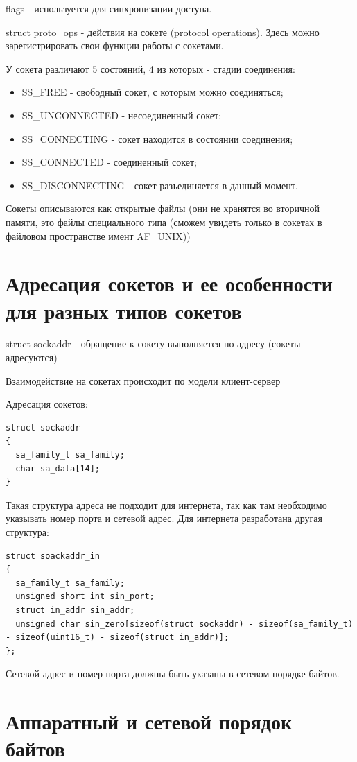 flags - используется для синхронизации доступа.

struct proto\_ops - действия на сокете (protocol operations). Здесь можно зарегистрировать свои функции работы с сокетами.

У сокета различают 5 состояний, 4 из которых - стадии соединения:

\begin{itemize}
\item SS\_FREE - свободный сокет, с которым можно соединяться;
\item SS\_UNCONNECTED - несоединенный сокет;
\item SS\_CONNECTING - сокет находится в состоянии соединения;
\item SS\_CONNECTED - соединенный сокет;
\item SS\_DISCONNECTING - сокет разъединяется в данный момент.
\end{itemize}

Сокеты описываются как открытые файлы (они не хранятся во вторичной памяти, это файлы специального типа (сможем увидеть только в сокетах в файловом пространстве имент AF\_UNIX))

\section{Адресация сокетов и ее особенности для разных типов сокетов}

struct sockaddr - обращение к сокету выполняется по адресу (сокеты адресуются)

Взаимодействие на сокетах происходит по модели клиент-сервер

Адресация сокетов:
\begin{lstlisting}
struct sockaddr
{
  sa_family_t sa_family;
  char sa_data[14]; 
}
\end{lstlisting}
Такая структура адреса не подходит для интернета, так как там необходимо указывать номер порта и сетевой адрес. Для интернета разработана другая структура:

\begin{lstlisting}
struct soackaddr_in
{
  sa_family_t sa_family;
  unsigned short int sin_port;
  struct in_addr sin_addr;
  unsigned char sin_zero[sizeof(struct sockaddr) - sizeof(sa_family_t) - sizeof(uint16_t) - sizeof(struct in_addr)];
};
\end{lstlisting}

Сетевой адрес и номер порта должны быть указаны в сетевом порядке байтов.

\section{Аппаратный и сетевой порядок байтов}

